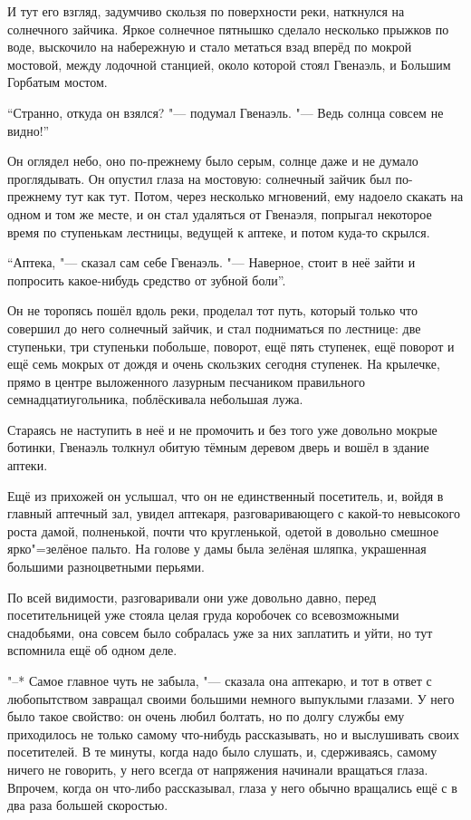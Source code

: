И тут его взгляд, задумчиво скользя по поверхности реки, наткнулся на
солнечного зайчика.
Яркое солнечное пятнышко сделало несколько прыжков по воде, выскочило на
набережную и стало метаться взад вперёд по мокрой мостовой, между лодочной
станцией, около которой стоял Гвенаэль, и Большим Горбатым мостом.

\enquote{Странно, откуда он взялся? "--- подумал Гвенаэль.
"--- Ведь солнца совсем не видно!}

Он оглядел небо, оно по-прежнему было серым, солнце даже и не думало
проглядывать.
Он опустил глаза на мостовую: солнечный зайчик был по-прежнему тут как тут.
Потом, через несколько мгновений, ему надоело скакать на одном и том же месте,
и он стал удаляться от Гвенаэля, попрыгал некоторое время по ступенькам
лестницы, ведущей к аптеке, и потом куда-то скрылся.

\enquote{Аптека, "--- сказал сам себе Гвенаэль.
"--- Наверное, стоит в неё зайти и попросить какое-нибудь средство от зубной
боли}.

Он не торопясь пошёл вдоль реки, проделал тот путь, который только что совершил
до него солнечный зайчик, и стал подниматься по лестнице: две ступеньки, три
ступеньки побольше, поворот, ещё пять ступенек, ещё поворот и ещё семь мокрых
от дождя и очень скользких сегодня ступенек.
На крылечке, прямо в центре выложенного лазурным песчаником правильного
семнадцатиугольника, поблёскивала небольшая лужа.

Стараясь не наступить в неё и не промочить и без того уже довольно мокрые
ботинки, Гвенаэль толкнул обитую тёмным деревом дверь и вошёл в здание аптеки.

Ещё из прихожей он услышал, что он не единственный посетитель, и, войдя в
главный аптечный зал, увидел аптекаря, разговаривающего с какой-то невысокого
роста дамой, полненькой, почти что кругленькой, одетой в довольно смешное
ярко"=зелёное пальто.
На голове у дамы была зелёная шляпка, украшенная большими разноцветными перьями.

По всей видимости, разговаривали они уже довольно давно, перед посетительницей
уже стояла целая груда коробочек со всевозможными снадобьями, она совсем было
собралась уже за них заплатить и уйти, но тут вспомнила ещё об одном деле.

"--* Самое главное чуть не забыла, "--- сказала она аптекарю, и тот в ответ с
любопытством завращал своими большими немного выпуклыми глазами.
У него было такое свойство: он очень любил болтать, но по долгу службы ему
приходилось не только самому что-нибудь рассказывать, но и выслушивать своих
посетителей.
В те минуты, когда надо было слушать, и, сдерживаясь, самому ничего не
говорить, у него всегда от напряжения начинали вращаться глаза.
Впрочем, когда он что-либо рассказывал, глаза у него обычно вращались ещё с в
два раза большей скоростью.

